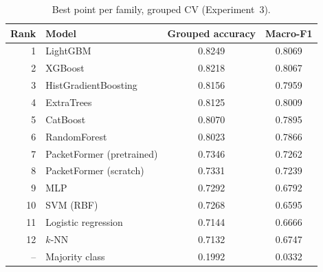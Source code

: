 \begin{table}[t]
\caption{Best point per family, grouped CV (Experiment~3).}
\label{tab:t3-leader}
\centering
\begin{tabular}{rlcc}
\hline
Rank & Model & Grouped accuracy & Macro-F1 \\
\hline
1 & LightGBM & 0.8249 & 0.8069 \\
2 & XGBoost & 0.8218 & 0.8067 \\
3 & HistGradientBoosting & 0.8156 & 0.7959 \\
4 & ExtraTrees & 0.8125 & 0.8009 \\
5 & CatBoost & 0.8070 & 0.7895 \\
6 & RandomForest & 0.8023 & 0.7866 \\
7 & PacketFormer (pretrained) & 0.7346 & 0.7262 \\
8 & PacketFormer (scratch) & 0.7331 & 0.7239 \\
9 & MLP & 0.7292 & 0.6792 \\
10 & SVM (RBF) & 0.7268 & 0.6595 \\
11 & Logistic regression & 0.7144 & 0.6666 \\
12 & $k$-NN & 0.7132 & 0.6747 \\
-- & Majority class & 0.1992 & 0.0332 \\
\hline
\end{tabular}
\end{table}

